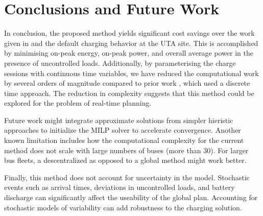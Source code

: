 \section{Conclusions and Future Work }
In conclusion, the proposed method yields significant cost savings over the work given in \cite{He_2019_Fast} and the default charging behavior at the UTA site. This is accomplished by minimising on-peak energy, on-peak power, and overall average power in the presence of uncontrolled loads. Additionally, by parameterising the charge sessions with continuous time variables, we have reduced the computational work by several orders of magnitude compared to prior work \cite{mortensen_comprehensive_2021}, which used a discrete time approach. The reduction in complexity suggests that this method could be explored for the problem of real-time planning. 
\par Future work might integrate approximate solutions from simpler hieristic approaches to initialize the MILP solver to accelerate convergence. Another known limitation includes how the computational complexity for the current method does not scale with large numbers of buses (more than 30). For larger bus fleets, a descentralized as opposed to a global method might work better. 
\par Finally, this method does not account for uncertainty in the model.  Stochastic events such as arrival times, deviations in uncontrolled loads, and battery discharge can significantly affect the useability of the global plan. Accounting for stochastic models of variability can add robustness to the charging solution. 
